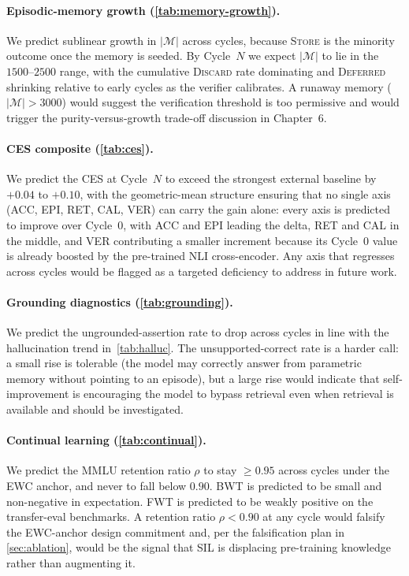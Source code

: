 \paragraph{Episodic-memory growth (\cref{tab:memory-growth}).}
We predict sublinear growth in $|\mathcal{M}|$ across cycles, because
\textsc{Store} is the minority outcome once the memory is seeded.
By Cycle~$N$ we expect $|\mathcal{M}|$ to lie in the $1500$--$2500$
range, with the cumulative \textsc{Discard} rate dominating and
\textsc{Deferred} shrinking relative to early cycles as the verifier
calibrates. A runaway memory ($|\mathcal{M}| > 3000$) would suggest
the verification threshold is too permissive and would trigger the
purity-versus-growth trade-off discussion in Chapter~6.

\paragraph{CES composite (\cref{tab:ces}).}
We predict the CES at Cycle~$N$ to exceed the strongest external
baseline by $+0.04$ to $+0.10$, with the geometric-mean structure
ensuring that no single axis (ACC, EPI, RET, CAL, VER) can carry the
gain alone: every axis is predicted to improve over Cycle~$0$, with
ACC and EPI leading the delta, RET and CAL in the middle, and VER
contributing a smaller increment because its Cycle~$0$ value is
already boosted by the pre-trained NLI cross-encoder. Any axis that
regresses across cycles would be flagged as a targeted deficiency to
address in future work.

\paragraph{Grounding diagnostics (\cref{tab:grounding}).}
We predict the ungrounded-assertion rate to drop across cycles in
line with the hallucination trend in~\cref{tab:halluc}. The
unsupported-correct rate is a harder call: a small rise is tolerable
(the model may correctly answer from parametric memory without
pointing to an episode), but a large rise would indicate that
self-improvement is encouraging the model to bypass retrieval even
when retrieval is available and should be investigated.

\paragraph{Continual learning (\cref{tab:continual}).}
We predict the MMLU retention ratio $\rho$ to stay $\ge 0.95$ across
cycles under the EWC anchor, and never to fall below $0.90$. BWT is
predicted to be small and non-negative in expectation. FWT is
predicted to be weakly positive on the transfer-eval benchmarks. A
retention ratio $\rho < 0.90$ at any cycle would falsify the
EWC-anchor design commitment and, per the falsification plan in
\cref{sec:ablation}, would be the signal that SIL is displacing
pre-training knowledge rather than augmenting it.

